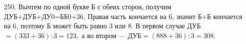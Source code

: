 250. Вычтем по одной букве Б с обеих сторон, получим ДУБ+ДУБ+ДУ0=ББ0+36. Правая часть кончается на 6, значит Б+Б кончается на 6, поэтому Б может быть равно 3 или 8. В первом случае ДУБ$=(333+36):3=123,$ а во втором --- ДУБ$=(888+36):3=308.$\\
